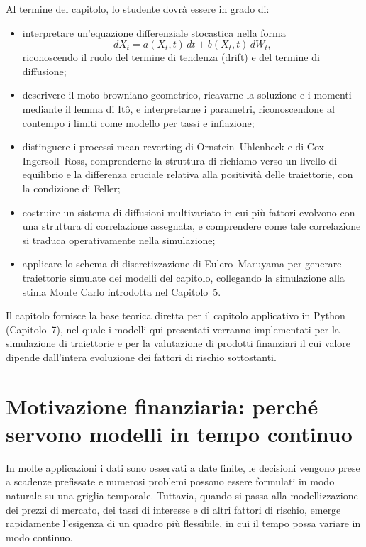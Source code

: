 Al termine del capitolo, lo studente dovr\`{a} essere in grado di:

\begin{itemize}

\item interpretare un'equazione differenziale stocastica nella forma
\[
dX_t=a(X_t,t)\,dt+b(X_t,t)\,dW_t, 
\]
riconoscendo il ruolo del termine
di tendenza (drift) e del termine di diffusione;

\item descrivere il moto browniano geometrico, ricavarne la soluzione
e i momenti mediante il lemma di It\^{o}, e interpretarne i parametri,
riconoscendone al contempo i limiti come modello per tassi e
inflazione;

\item distinguere i processi mean-reverting di Ornstein--Uhlenbeck e
di Cox--Ingersoll--Ross, comprenderne la struttura di richiamo verso
un livello di equilibrio e la differenza cruciale relativa alla
positivit\`{a} delle traiettorie, con la condizione di Feller;

\item costruire un sistema di diffusioni multivariato in cui pi\`{u}
fattori evolvono con una struttura di correlazione assegnata, e
comprendere come tale correlazione si traduca operativamente nella
simulazione;

\item applicare lo schema di discretizzazione di Eulero--Maruyama per
generare traiettorie simulate dei modelli del capitolo, collegando la
simulazione alla stima Monte Carlo introdotta nel Capitolo~5.

\end{itemize}

Il capitolo fornisce la base teorica diretta per il capitolo applicativo
in Python (Capitolo~7), nel quale i modelli qui presentati verranno
implementati per la simulazione di traiettorie e per la valutazione di
prodotti finanziari il cui valore dipende dall'intera evoluzione dei
fattori di rischio sottostanti.


\section{Motivazione finanziaria: perch\'{e} servono modelli in tempo continuo}

In molte applicazioni i dati sono
osservati a date finite, le decisioni vengono prese a scadenze
prefissate e numerosi problemi possono essere formulati in modo naturale
su una griglia temporale. Tuttavia, quando si passa alla modellizzazione
dei prezzi di mercato, dei tassi di interesse e di altri fattori di
rischio, emerge rapidamente l'esigenza di un quadro pi\`{u} flessibile,
in cui il tempo possa variare in modo continuo.

